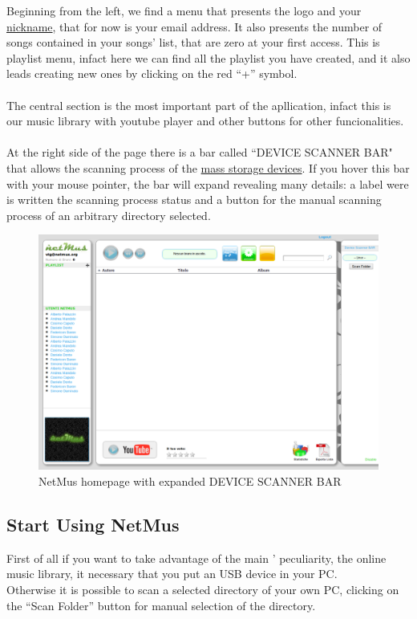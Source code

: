 Beginning from the left, we find a menu that presents the  logo and
your \underline{nickname}, that for now is your email address. It also presents
the number of songs contained in your songs' list, that are zero at your first
access. This is playlist menu, infact here we can find all the playlist you have
created, and it also leads creating new ones by clicking on the red ``+''
symbol.\\
\\
The central section is the most important part of the apllication, infact this
is our music library with youtube player and other buttons for other
funcionalities.\\
\\
At the right side of the page there is a bar called ``DEVICE SCANNER BAR" that
allows the scanning process of the \underline{mass storage devices}. If you
hover this bar with your mouse pointer, the bar will expand revealing many details: a label were is
written  the scanning process status and a button for the manual scanning
process of an arbitrary directory selected.\\

\begin{figure}[htbp]
  \centering
  \includegraphics[width=15cm]{img/MU/applet_bar_open.png}
\caption{NetMus homepage with expanded DEVICE SCANNER BAR}
\end{figure}

\subsection{Start Using NetMus}

First of all if you want to take advantage of the main ' peculiarity,
the online music library, it necessary that you put an USB device in your PC.\\
Otherwise it is possible to scan a selected directory of your own PC, clicking
on the ``Scan Folder'' button for manual selection of the directory.\\ 

